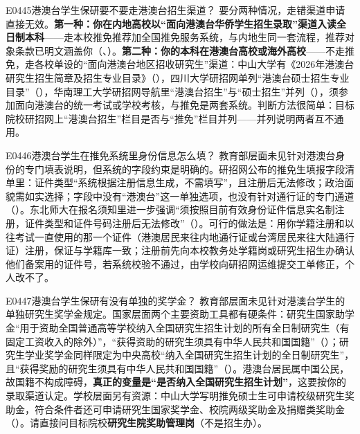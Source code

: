 \begin{qa}{E0445}{港澳台学生保研要不要走港澳台招生渠道？}
要分两种情况，走错渠道申请直接无效。\textbf{第一种：你在内地高校以“面向港澳台华侨学生招生录取”渠道入读全日制本科}——走本校推免推荐加全国推免服务系统，与内地生同一套流程，推荐对象条款已明文涵盖你（、）。\textbf{第二种：你的本科在港澳台高校或海外高校}——不走推免，走各校单设的“面向港澳台地区招收研究生”渠道：中山大学有《2026年港澳台研究生招生简章及招生专业目录》（），四川大学研招网单列“港澳台硕士招生专业目录”（），华南理工大学研招网导航里“港澳台招生”与“硕士招生”并列（），须参加面向港澳台的统一考试或学校考核，与推免是两套系统。判断方法很简单：目标院校研招网上“港澳台招生”栏目是否与“推免”栏目并列——并列说明两者互不通用。
\end{qa}

\begin{qa}{E0446}{港澳台学生在推免系统里身份信息怎么填？}
教育部层面未见针对港澳台身份的专门填表说明，但系统的字段约束是明确的。研招网公布的推免生填报字段清单里：证件类型“系统根据注册信息生成，不需填写”，且注册后无法修改；政治面貌需如实选择；字段中没有“港澳台”这一单独选项，也没有针对通行证的专门通道（）。东北师大在报名须知里进一步强调“须按照目前有效身份证件信息实名制注册，证件类型和证件号码注册后无法修改”（）。可行的做法是：用你学籍注册和以往考试一直使用的那一个证件（港澳居民来往内地通行证或台湾居民来往大陆通行证）注册，保证与学籍库一致；注册前先向本校教务处学籍岗或研究生招生办确认他们备案用的证件号，若系统校验不通过，由学校向研招网运维提交工单修正，个人改不了。
\end{qa}

\begin{qa}{E0447}{港澳台学生保研有没有单独的奖学金？}
教育部层面未见针对港澳台学生的单独研究生奖学金规定。国家层面两个主要资助工具都有硬条件：研究生国家助学金“用于资助全国普通高等学校纳入全国研究生招生计划的所有全日制研究生（有固定工资收入的除外）”，“获得资助的研究生须具有中华人民共和国国籍”（）；研究生学业奖学金同样限定为中央高校“纳入全国研究生招生计划的全日制研究生”，且“获得奖励的研究生须具有中华人民共和国国籍”（）。港澳台居民属中国公民，故国籍不构成障碍，\textbf{真正的变量是“是否纳入全国研究生招生计划”}，这要按你的录取渠道认定。学校层面另有资源：中山大学写明推免硕士生可申请校级研究生奖助金，符合条件者还可申请研究生国家奖学金、校院两级奖助金及捐赠类奖助金（）。请直接问目标院校\textbf{研究生院奖助管理岗}（不是招生办）。
\end{qa}

